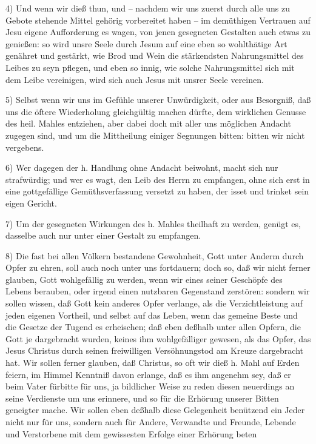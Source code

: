 {4) Und wenn wir dieß thun, und -- nachdem wir uns zuerst durch alle uns zu Gebote stehende Mittel gehörig vorbereitet haben -- im demüthigen Vertrauen auf Jesu eigene Aufforderung es wagen, von jenen gesegneten Gestalten auch etwas zu genießen: so wird unsre Seele durch Jesum auf eine eben so wohlthätige Art genähret und gestärkt, wie Brod und Wein die stärkendsten Nahrungsmittel des Leibes zu seyn pflegen, und eben so innig, wie solche Nahrungsmittel sich mit dem Leibe vereinigen, wird sich auch Jesus mit unsrer Seele vereinen. \par
5) Selbst wenn wir uns im Gefühle unserer Unwürdigkeit, oder aus Besorgniß, daß uns die öftere Wiederholung gleichgültig machen dürfte, dem wirklichen Genusse des heil. Mahles entziehen, aber dabei doch mit aller uns möglichen Andacht zugegen sind, und um die Mittheilung einiger Segnungen bitten: bitten wir nicht vergebens. \par
6) Wer dagegen der h. Handlung ohne Andacht beiwohnt, macht sich nur strafwürdig; und wer es wagt, den Leib des Herrn zu empfangen, ohne sich erst in eine gottgefällige Gemüthsverfassung versetzt zu haben, der isset und trinket sein eigen Gericht. \par
7) Um der gesegneten Wirkungen des h. Mahles theilhaft zu werden, genügt es, dasselbe auch nur unter einer Gestalt zu empfangen. \par
8) Die fast bei allen Völkern bestandene Gewohnheit, Gott unter Anderm durch Opfer zu ehren, soll auch noch unter uns fortdauern; doch so, daß wir nicht ferner glauben, Gott wohlgefällig zu werden, wenn wir eines seiner Geschöpfe des Lebens berauben, oder irgend einen nutzbaren Gegenstand zerstören: sondern wir sollen wissen, daß Gott kein anderes Opfer verlange, als die Verzichtleistung auf jeden eigenen Vortheil, und selbst auf das Leben, wenn das gemeine Beste und die Gesetze der Tugend es erheischen; daß eben deßhalb unter allen Opfern, die Gott je dargebracht wurden, keines ihm wohlgefälliger gewesen, als das Opfer, das Jesus Christus durch seinen freiwilligen Versöhnungstod am Kreuze dargebracht hat. Wir sollen ferner glauben, daß Christus, so oft wir dieß h. Mahl auf Erden feiern, im Himmel Kenntniß davon erlange, daß es ihm angenehm sey, daß er beim Vater fürbitte für uns, ja bildlicher Weise zu reden diesen neuerdings an seine Verdienste um uns erinnere, und so für die Erhörung unserer Bitten geneigter mache. Wir sollen eben deßhalb diese Gelegenheit benützend ein Jeder nicht nur für uns, sondern auch für Andere, Verwandte und Freunde, Lebende und Verstorbene mit dem gewissesten Erfolge einer Erhörung beten} \usw\ 
